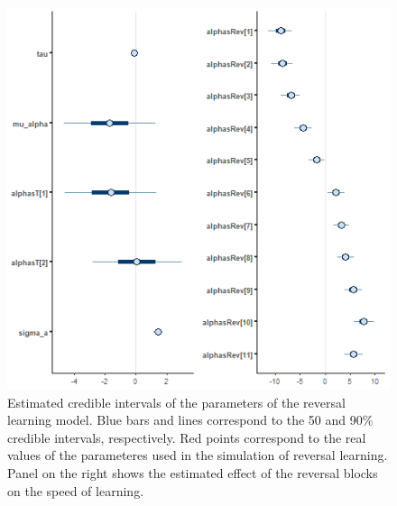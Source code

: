 \documentclass[
]{article}
\begin{document}
\begin{figure}

\includegraphics[width=6.67in,]{images/boussard_mcmc_interv_rev} \hfill{}

\caption{Estimated credible intervals of the parameters of the reversal learning model. Blue bars and lines correspond to the 50 and 90\% credible intervals, respectively. Red points correspond to the real values of the parameteres used in the simulation of reversal learning. Panel on the right shows the estimated effect of the reversal blocks on the speed of learning.}\label{fig:interv_rev}
\end{figure}
\end{document}
